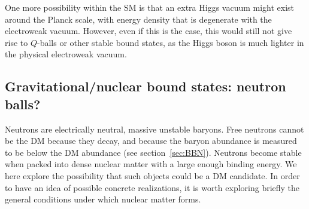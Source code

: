 One more possibility within the SM
is that an extra Higgs vacuum might exist around the Planck scale, 
with energy density that is degenerate with the electroweak vacuum. 
However, even if this is the case, this would still not give rise to $Q$-balls or other stable bound states, 
as the Higgs boson is much lighter in the physical electroweak vacuum.


\subsection{Gravitational/nuclear bound states: neutron balls?}
Neutrons are electrically neutral, massive unstable baryons.
Free neutrons cannot be the DM because they decay, and because the baryon abundance is measured to be below the DM abundance (see section~\ref{sec:BBN}).
Neutrons become stable when packed into dense nuclear matter with a large enough binding energy.
We here explore the possibility that
such objects could be a DM candidate. 
In order to have an idea of possible concrete realizations, it is worth exploring briefly the general conditions under which nuclear matter forms.

